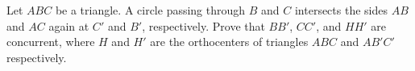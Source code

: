 Let $ABC$ be a triangle. A circle passing through $B$ and $C$ intersects the sides $AB$ and $AC$ again at $C'$ and $B'$, respectively. Prove that $BB'$, $CC'$, and $HH'$ are concurrent, where $H$ and $H'$ are the orthocenters of triangles $ABC$ and $AB'C'$ respectively.

